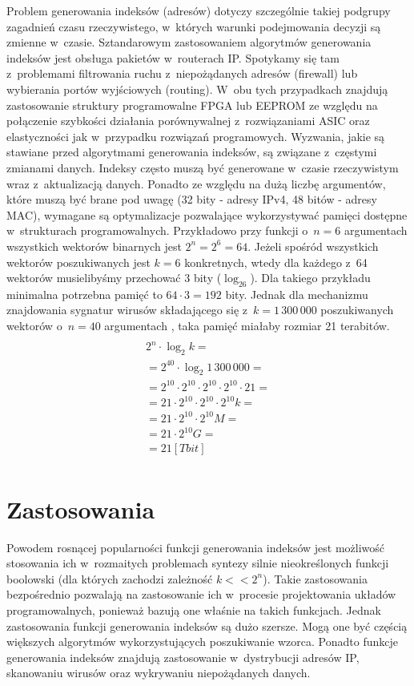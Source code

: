 Problem generowania indeksów (adresów) dotyczy szczególnie takiej podgrupy zagadnień czasu rzeczywistego,
w~których warunki podejmowania decyzji są zmienne w~czasie.
Sztandarowym zastosowaniem algorytmów generowania indeksów jest obsługa pakietów w~routerach IP.
Spotykamy się tam z~problemami filtrowania ruchu z~niepożądanych adresów (firewall) lub wybierania portów wyjściowych (routing).
W~obu tych przypadkach znajdują zastosowanie struktury programowalne FPGA lub EEPROM
ze względu na połączenie szybkości działania porównywalnej z~rozwiązaniami ASIC oraz elastyczności
jak w~przypadku rozwiązań programowych.
Wyzwania,
jakie są stawiane przed algorytmami generowania indeksów,
są związane z~częstymi zmianami danych.
Indeksy często muszą być generowane w~czasie rzeczywistym wraz z~aktualizacją danych.
Ponadto ze względu na dużą liczbę argumentów,
które muszą być brane pod uwagę (32 bity - adresy IPv4, 48 bitów - adresy MAC),
wymagane są optymalizacje pozwalające wykorzystywać pamięci dostępne w~strukturach programowalnych.
Przykładowo przy funkcji o~$n=6$ argumentach wszystkich wektorów binarnych jest $2^n = 2^6 = 64$.
Jeżeli spośród wszystkich wektorów poszukiwanych jest $k=6$ konkretnych, wtedy dla każdego z~64 wektorów musielibyśmy przechować 3 bity ($\log_26$).
Dla takiego przykładu minimalna potrzebna pamięć to $64 \cdot 3 = 192$ bity.
Jednak dla mechanizmu znajdowania sygnatur wirusów składającego się z~$k=1\,300\,000$ poszukiwanych wektorów o~$n=40$ argumentach \cite{wirusy}, taka pamięć miałaby rozmiar 21 terabitów.
\begin{multline} \\
2^n \cdot \log_2 k = \\
= 2^{40} \cdot \log_2 1\,300\,000 = \\
= 2^{10} \cdot 2^{10} \cdot 2^{10} \cdot 2^{10} \cdot 21 = \\
=21 \cdot 2^{10} \cdot 2^{10} \cdot 2^{10} k = \\
=21 \cdot 2^{10} \cdot 2^{10} M = \\
=21 \cdot 2^{10} G = \\
=21 [Tbit] \\
\end{multline}

\section{Zastosowania}

Powodem rosnącej popularności funkcji generowania indeksów jest możliwość stosowania ich
w~rozmaitych problemach syntezy silnie nieokreślonych funkcji boolowski (dla których zachodzi zależność $k << 2^n$).
Takie zastosowania bezpośrednio pozwalają na zastosowanie ich w~procesie projektowania układów programowalnych,
ponieważ bazują one właśnie na takich funkcjach.
Jednak zastosowania funkcji generowania indeksów są dużo szersze.
Mogą one być częścią większych algorytmów wykorzystujących poszukiwanie wzorca.
Ponadto funkcje generowania indeksów znajdują zastosowanie w~dystrybucji adresów IP,
skanowaniu wirusów oraz wykrywaniu niepożądanych danych.

